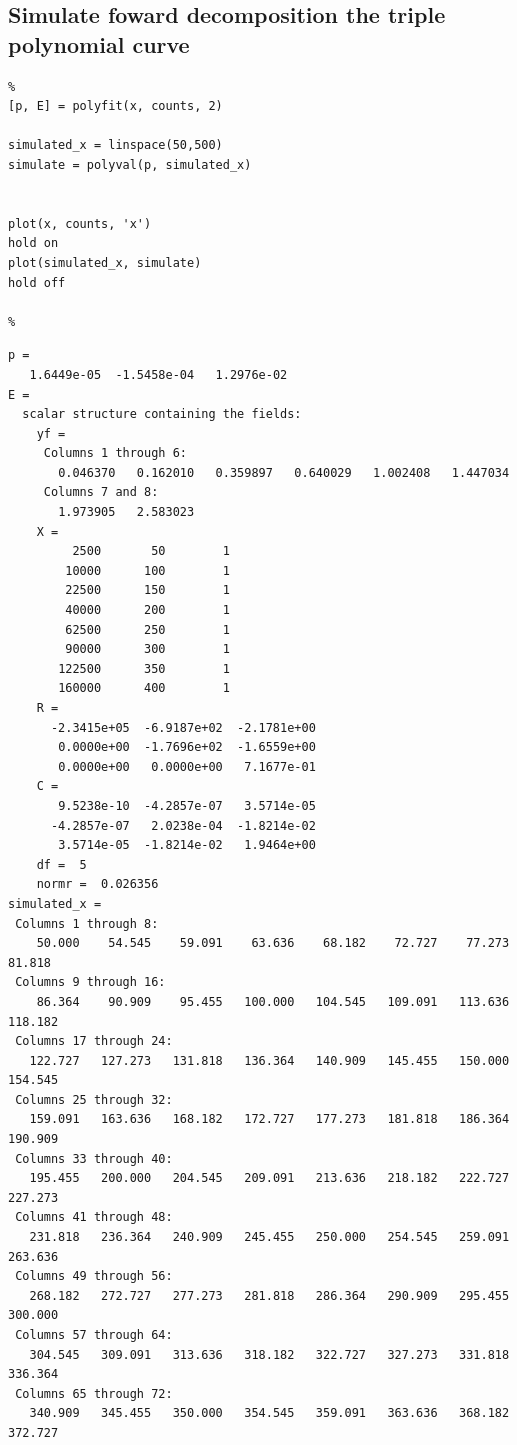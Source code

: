 \documentclass[10pt]{article}
\begin{document}
{}
\subsection*{Simulate foward decomposition the triple polynomial curve}

\begin{lstlisting}
%
[p, E] = polyfit(x, counts, 2)

simulated_x = linspace(50,500)
simulate = polyval(p, simulated_x)


plot(x, counts, 'x')
hold on
plot(simulated_x, simulate)
hold off

%
\end{lstlisting}
\begin{lstlisting}[language={},xleftmargin=5pt,frame=none]
p =
   1.6449e-05  -1.5458e-04   1.2976e-02
E =
  scalar structure containing the fields:
    yf =
     Columns 1 through 6:
       0.046370   0.162010   0.359897   0.640029   1.002408   1.447034
     Columns 7 and 8:
       1.973905   2.583023
    X =
         2500       50        1
        10000      100        1
        22500      150        1
        40000      200        1
        62500      250        1
        90000      300        1
       122500      350        1
       160000      400        1
    R =
      -2.3415e+05  -6.9187e+02  -2.1781e+00
       0.0000e+00  -1.7696e+02  -1.6559e+00
       0.0000e+00   0.0000e+00   7.1677e-01
    C =
       9.5238e-10  -4.2857e-07   3.5714e-05
      -4.2857e-07   2.0238e-04  -1.8214e-02
       3.5714e-05  -1.8214e-02   1.9464e+00
    df =  5
    normr =  0.026356
simulated_x =
 Columns 1 through 8:
    50.000    54.545    59.091    63.636    68.182    72.727    77.273    81.818
 Columns 9 through 16:
    86.364    90.909    95.455   100.000   104.545   109.091   113.636   118.182
 Columns 17 through 24:
   122.727   127.273   131.818   136.364   140.909   145.455   150.000   154.545
 Columns 25 through 32:
   159.091   163.636   168.182   172.727   177.273   181.818   186.364   190.909
 Columns 33 through 40:
   195.455   200.000   204.545   209.091   213.636   218.182   222.727   227.273
 Columns 41 through 48:
   231.818   236.364   240.909   245.455   250.000   254.545   259.091   263.636
 Columns 49 through 56:
   268.182   272.727   277.273   281.818   286.364   290.909   295.455   300.000
 Columns 57 through 64:
   304.545   309.091   313.636   318.182   322.727   327.273   331.818   336.364
 Columns 65 through 72:
   340.909   345.455   350.000   354.545   359.091   363.636   368.182   372.727

\end{lstlisting}
\end{document}
